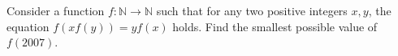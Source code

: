 Consider a function $f:\mathbb N\rightarrow \mathbb N$ such that for any two positive integers $x,y$, the equation $f(xf(y))=yf(x)$ holds. Find the smallest possible value of $f(2007)$.